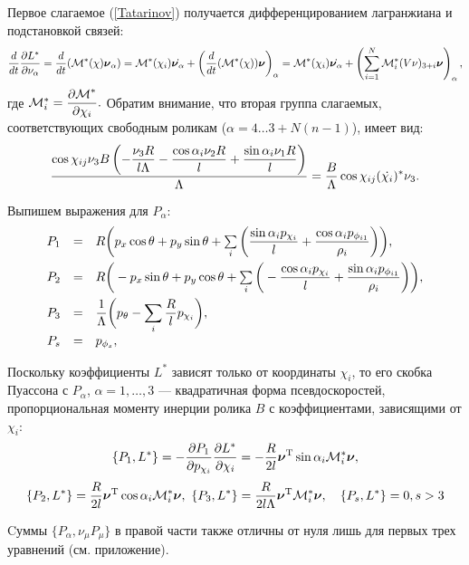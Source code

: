 Первое слагаемое (\ref{Tatarinov}) получается дифференцированием лагранжиана и подстановкой связей:
\begin{equation}
    \frac{d}{dt}\frac{\partial L^{*}}{\partial \nu_\alpha} = \frac{d}{dt}(\mathcal{M}^*(\chi)\boldsymbol{\mathbf{\nu}}_\alpha) = 
    \mathcal{M}^*(\chi_i)\dot{\boldsymbol{\mathbf{\nu}}_\alpha} +
    \left(\frac{d}{dt}(\mathcal{M}^*(\chi))\boldsymbol{\mathbf{\nu}}\right)_\alpha =
    \mathcal{M}^*(\chi_i)\dot{\boldsymbol{\mathbf{\nu}}_\alpha} +
    \left(\sum_{i=1}^{N}\mathcal{M}^*_i(V\nu)_{3+i}\boldsymbol{\mathbf{\nu}}\right)_\alpha,
\end{equation}
где $\mathcal{M}^*_i = \displaystyle\frac{\displaystyle \partial \mathcal{M}^*}{\displaystyle \partial \chi_i}.$ Обратим внимание, что вторая группа слагаемых, соответствующих свободным роликам ($\alpha = 4\dots 3 + N(n-1)$),  имеет вид:
\begin{equation}
    \frac{\cos\chi_{ij} \nu_3 B \left( -\displaystyle\frac{\displaystyle \nu_3 R}{\displaystyle l \Lambda}-\displaystyle\frac{\displaystyle \cos\alpha_i \nu_2 R}{\displaystyle l}+\displaystyle\frac{\displaystyle \sin\alpha_i \nu_1 R}{\displaystyle l}\right) }{\Lambda} = \frac{B}{\Lambda}\cos\chi_{ij}(\dot{\chi_i})^*\nu_3.
\end{equation}
 
Выпишем выражения для $P_\alpha$:
\begin{equation}\label{P}
    \begin{array}{rcl}
        P_1 & = & R\bigg(p_x\cos\theta + p_y\sin\theta + \sum\limits_{i}\bigg(\ddfrac{\sin\alpha_ip_{\chi_i}}{l} +  \ddfrac{\cos\alpha_ip_{\phi_{i1}}}{\rho_i}\bigg)\bigg),\vsp
        P_2 & = & R\bigg(-p_x\sin\theta + p_y\cos\theta + \sum\limits_{i}\bigg(-\ddfrac{\cos\alpha_ip_{\chi_i}}{l} +  \ddfrac{\sin\alpha_ip_{\phi_{i1}}}{\rho_i}\bigg)\bigg),\vsp
        P_3 & = & \ddfrac{1}{\Lambda}\bigg(p_\theta - \sum\limits_{i}\ddfrac{R}{l}p_{\chi_i}\bigg),\vsp
        P_s & = & p_{\phi_s},
    \end{array}
\end{equation}

Поскольку коэффициенты  $L^{*}$ зависят только от координаты $\chi_i$, то его скобка Пуассона с $P_\alpha$, $\alpha=1,\dots, 3$ --- квадратичная форма псевдоскоростей, пропорциональная моменту инерции ролика $B$ с коэффициентами, зависящими от $\chi_i$:
$$
\{P_1, L^*\} = -\frac{\partial P_1}{\partial p_{\chi_i}}\frac{\partial L^*}{\partial \chi_i} = -\frac{R}{2l}\boldsymbol{\mathbf{\nu}}^\mathrm{T}\sin\alpha_i\mathcal{M}^*_i\boldsymbol{\mathbf{\nu}},
$$
$$
\{P_2, L^*\} = \frac{R}{2l}\boldsymbol{\mathbf{\nu}}^\mathrm{T}\cos\alpha_i\mathcal{M}^*_i\boldsymbol{\mathbf{\nu}},\  
\{P_3, L^*\} = \frac{R}{2l\Lambda}\boldsymbol{\mathbf{\nu}}^\mathrm{T}\mathcal{M}^*_i\boldsymbol{\mathbf{\nu}},\quad \{P_s,L^*\} = 0, s>3
$$

Cуммы $\{P_\alpha, \nu_\mu P_\mu\}$ в правой части также отличны от нуля лишь для первых трех уравнений (см. приложение).

